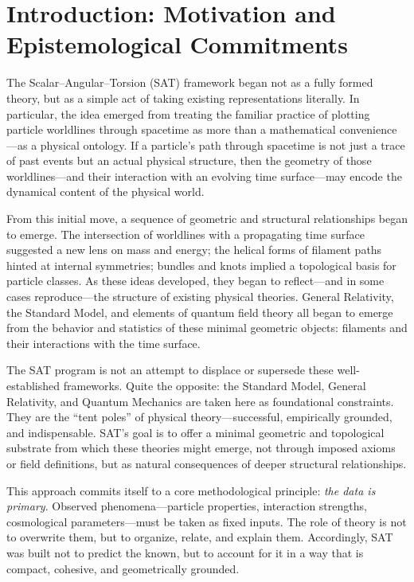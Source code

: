 \documentclass[12pt]{article}
\begin{document}
\section*{Introduction: Motivation and Epistemological Commitments}

The Scalar--Angular--Torsion (SAT) framework began not as a fully formed theory, but as a simple act of taking existing representations literally. In particular, the idea emerged from treating the familiar practice of plotting particle worldlines through spacetime as more than a mathematical convenience---as a physical ontology. If a particle's path through spacetime is not just a trace of past events but an actual physical structure, then the geometry of those worldlines---and their interaction with an evolving time surface---may encode the dynamical content of the physical world.

From this initial move, a sequence of geometric and structural relationships began to emerge. The intersection of worldlines with a propagating time surface suggested a new lens on mass and energy; the helical forms of filament paths hinted at internal symmetries; bundles and knots implied a topological basis for particle classes. As these ideas developed, they began to reflect---and in some cases reproduce---the structure of existing physical theories. General Relativity, the Standard Model, and elements of quantum field theory all began to emerge from the behavior and statistics of these minimal geometric objects: filaments and their interactions with the time surface.

The SAT program is not an attempt to displace or supersede these well-established frameworks. Quite the opposite: the Standard Model, General Relativity, and Quantum Mechanics are taken here as foundational constraints. They are the ``tent poles'' of physical theory---successful, empirically grounded, and indispensable. SAT's goal is to offer a minimal geometric and topological substrate from which these theories might emerge, not through imposed axioms or field definitions, but as natural consequences of deeper structural relationships.

This approach commits itself to a core methodological principle: \emph{the data is primary}. Observed phenomena---particle properties, interaction strengths, cosmological parameters---must be taken as fixed inputs. The role of theory is not to overwrite them, but to organize, relate, and explain them. Accordingly, SAT was built not to predict the known, but to account for it in a way that is compact, cohesive, and geometrically grounded.
\end{document}
